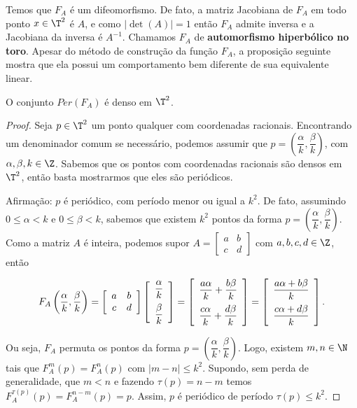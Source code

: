 Temos que $F_A$ é um difeomorfismo. De fato, a matriz Jacobiana de $F_A$ em todo ponto $x\in\T^2$ é $A$, e como $|\det(A)|=1$ então $F_A$ admite inversa e a Jacobiana da inversa é $A^{-1}$. Chamamos $F_A$ de \textbf{automorfismo hiperbólico no toro}. Apesar do método de construção da função $F_A$, a proposição seguinte mostra que ela possui um comportamento bem diferente de sua equivalente linear.

\begin{proposicao} O conjunto $Per(F_A)$ é denso em $\T^2$.
\end{proposicao}

\begin{proof} Seja $p\in\T^2$ um ponto qualquer com coordenadas racionais. Encontrando um denominador comum se necessário, podemos assumir que $p=\left(\dfrac{\alpha}{k},\dfrac{\beta}{k}\right)$, com $\alpha,\beta,k\in\Z$. Sabemos que os pontos com coordenadas racionais são densos em $\T^2$, então basta mostrarmos que eles são periódicos.

Afirmação: $p$ é periódico, com período menor ou igual a $k^2$. De fato, assumindo $0\leq \alpha<k$ e $0\leq \beta<k$, sabemos que existem $k^2$ pontos da forma $p=\left(\dfrac{\alpha}{k},\dfrac{\beta}{k}\right)$. Como a matriz $A$ é inteira, podemos supor $A=\left[\begin{array}{cc}a & b\\ c & d\end{array}\right]$ com $a,b,c,d\in\Z$, então

\begin{equation*}
F_A\left(\dfrac{\alpha}{k},\dfrac{\beta}{k}\right)=\left[\begin{array}{cc}a & b\\ c & d\end{array}\right]\left[\begin{array}{c}\dfrac{\alpha}{k}\vspace{0.2cm}\\\dfrac{\beta}{k}\end{array}\right]=\left[\begin{array}{c}\dfrac{a\alpha}{k}+\dfrac{b\beta}{k}\vspace{0.2cm}\\ \dfrac{c\alpha}{k}+\dfrac{d\beta}{k}\end{array}\right]=\left[\begin{array}{c}\dfrac{a\alpha+b\beta}{k}\vspace{0.2cm}\\ \dfrac{c\alpha+d\beta}{k}\end{array}\right].
\end{equation*}

Ou seja, $F_A$ permuta os pontos da forma $p=\left(\dfrac{\alpha}{k},\dfrac{\beta}{k}\right)$. Logo, existem $m,n\in\N$ tais que $F_A^m(p)=F_A^n(p)$ com $|m-n|\leq k^2$. Supondo, sem perda de generalidade, que $m<n$ e fazendo $\tau(p)=n-m$ temos $F_A^{\tau(p)}(p)=F_A^{n-m}(p)=p$. Assim, $p$ é periódico de período $\tau(p)\leq k^2$.
\end{proof}

